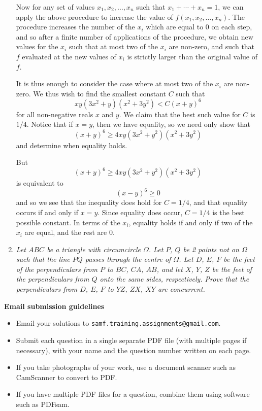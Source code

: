 \documentclass{article}
\begin{document}
\begin{enumerate}[1.]
Now for any set of values $x_1, x_2, \dots, x_n$ such that $x_1 + \cdots + x_n = 1$, we can apply the above procedure to increase the value of $f(x_1, x_2, \dots, x_n)$. The procedure increases the number of the $x_i$ which are equal to $0$ on each step, and so after a finite number of applications of the procedure, we obtain new values for the $x_i$ such that at most two of the $x_i$ are non-zero, and such that $f$ evaluated at the new values of $x_i$ is strictly larger than the original value of $f$.

It is thus enough to consider the case where at most two of the $x_i$ are non-zero. We thus wish to find the smallest constant $C$ such that
\[
	x y (3x^2 + y)(x^2 + 3y^2) < C{(x + y)}^6
\]
for all non-negative reals $x$ and $y$. We claim that the best such value for $C$ is $1/4$. Notice that if $x = y$, then we have equality, so we need only show that
\[
	{(x + y)}^6 \geq 4xy(3x^2 + y^2)(x^2 + 3y^2)
\]
and determine when equality holds.

But
\[
	{(x + y)}^6 \geq 4xy(3x^2 + y^2)(x^2 + 3y^2)
\]
is equivalent to
\[
	{(x - y)}^6 \geq 0
\]
and so we see that the inequality does hold for $C = 1/4$, and that equality occurs if and only if $x = y$. Since equality does occur, $C = 1/4$ is the best possible constant. In terms of the $x_i$, equality holds if and only if two of the $x_i$ are equal, and the rest are $0$.


\vspace{6pt}
\item 
\textit{Let $ABC$ be a triangle with circumcircle $\Omega$. Let $P$, $Q$ be 2 points not on $\Omega$ such that the line $PQ$ passes through the centre of $\Omega$. Let $D$, $E$, $F$ be the feet of the perpendiculars from $P$ to $BC$, $CA$, $AB$, and let $X$, $Y$, $Z$ be the feet of the perpendiculars from $Q$ onto the same sides, respectively. Prove that the perpendiculars from $D$, $E$, $F$ to $YZ$, $ZX$, $XY$ are concurrent.}

\end{enumerate}


\vfill
\textbf{\Large Email submission guidelines}
\begin{itemize}
	\item Email your solutions to \verb!samf.training.assignments@gmail.com!.
	\item Submit each question in a single separate PDF file (with multiple pages if necessary), with your name and the question number written on each page.
	\item If you take photographs of your work, use a document scanner such as CamScanner to convert to PDF.
	\item If you have multiple PDF files for a question, combine them using software such as PDFsam.
\end{itemize}
\end{document}
